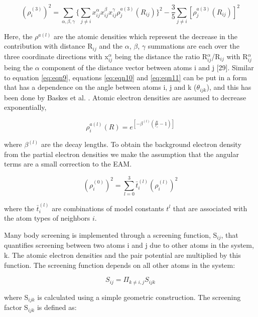 \documentclass[review]{elsarticle}
\begin{document}
\begin{equation}
\label{eq:eqn11}
(\rho_{i}^{(3)})^{2}=\sum_{\alpha,\beta,\gamma}\{ \sum_{j \neq i}x_{ij}^{\alpha}x_{ij}^{\beta}x_{ij}^{\gamma}\rho_{j}^{a(3)}(R_{ij}) \}^{2} - \frac{3}{5}\sum_{j \neq i}[\rho_{j}^{a(3)}(R_{ij})]^2
\end{equation}

Here, the $\rho^{a(l)}$  are the atomic densities which represent the decrease in the contribution with distance R$_{ij}$ and the $\alpha$, $\beta$, $\gamma$ summations are each over the three coordinate directions with x$_{ij}^{\alpha}$ being the distance the ratio R$_{ij}^{\alpha}$/R$_{ij}$ with R$_{ij}^{\alpha}$ being the $\alpha$ component of the distance vector between atoms i and j [29].  Similar to equation \ref{eq:eqn9}, equations \ref{eq:eqn10} and \ref{eq:eqn11} can be put in a form that has a dependence on the angle between atoms i, j and k ($\theta_{ijk}$), and this has been done by Baskes et al. \cite{baskes1989}.  Atomic electron densities are assumed to decrease exponentially, 

\begin{equation}
\label{eq:eqn12}
\rho_{i}^{a(l)}(R) = e^{[-\beta^{(l)}(\frac{R}{r_{e}}-1)]}
\end{equation}

where $\beta^{(l)}$ are the decay lengths.  To obtain the background electron density from the partial electron densities we make the assumption that the angular terms are a small correction to the EAM.

\begin{equation}
\label{eq:eqn13}
(\rho_{i}^{(0)})^{2} = \sum_{l=0}^{3}\bar{t}_{i}^{(l)} (\rho_{i}^{(l)})^{2}
\end{equation}

where the $\bar{t}_{i}^{(l)}$ \cite{valone2006} are combinations of model constants $t^{l}$ that are associated with the atom types of neighbors $i$.

Many body screening is implemented through a screening function, S$_{ij}$, that quantifies screening between two atoms i and j due to other atoms in the system, k.  The atomic electron densities and the pair potential are multiplied by this function.  The screening function depends on all other atoms in the system:

\begin{equation}
\label{eq:eqn14}
S_{ij}=\Pi_{k \neq i,j}S_{ijk}
\end{equation}

where S$_{ijk}$ is calculated using a simple geometric construction.  The screening factor S$_{ijk}$ is defined as:
\end{document}
